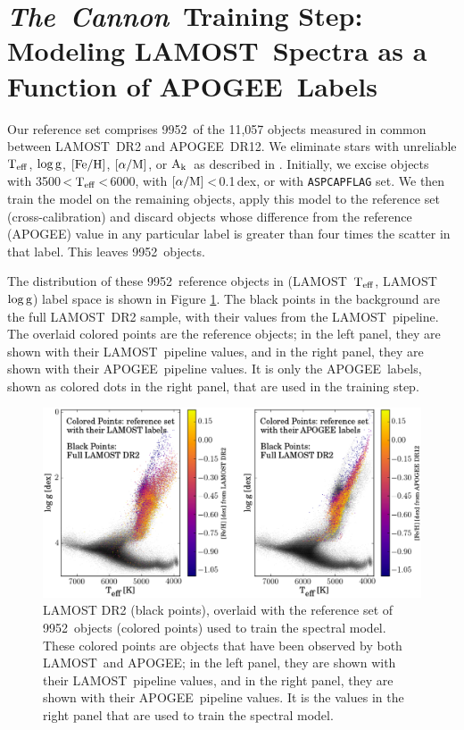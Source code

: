 \documentclass[12pt, letterpaper, preprint]{aastex}
\newcommand{\tc}{\textsl{The~Cannon}}
\newcommand{\apogee}{APOGEE}
\newcommand{\lamost}{LAMOST}
\newcommand{\teff}{\mbox{$\rm T_{eff}$}}
\newcommand{\feh}{\mbox{$\rm [Fe/H]$}}
\newcommand{\alpham}{\mbox{$\rm [\alpha/M]$}}
\newcommand{\logg}{\mbox{$\rm \log g$}}
\newcommand{\ak}{\mbox{$\rm A_k$}}
\newcommand{\ntrobj}{9952}
\begin{document}
\section{\tc\ Training Step: \\ Modeling \lamost\ Spectra as a Function of \apogee\ Labels}
\label{sec:training}

Our reference set comprises \ntrobj\ of the 11,057 objects measured in common between \lamost\ DR2 and \apogee\ DR12. 
We eliminate stars with
unreliable \teff, \logg, \feh, \alpham, or \ak\, as described in \citet{Holtzman2015}.
Initially, we excise objects with 3500\,\textless\,\teff\,\textless\,6000, 
with \alpham\,\textless\,0.1\,dex, 
or with \texttt{ASPCAPFLAG} set.
We then train the model on the remaining objects, apply this model
to the reference set (cross-calibration) and discard objects 
whose difference from the reference (\apogee) value
in any particular label is greater than four times the scatter in that label.
This leaves \ntrobj\ objects.

The distribution of these \ntrobj\ reference objects in (\lamost\ \teff, \lamost\ \logg) label space is shown in 
Figure \ref{fig:reference-set-label-space}. The black points in the background are the full
\lamost\ DR2 sample, with their values from the \lamost\ pipeline. 
The overlaid colored points are the reference objects; in the left panel, they are shown with their
\lamost\ pipeline values, and in the right panel, they are shown with their \apogee\ pipeline values.
It is only the \apogee\ labels, shown as colored dots in the right panel,
that are used in the training step. 

\begin{figure}[H]
\centering
\includegraphics[scale=0.6]{f3.eps}
\caption{
LAMOST DR2 (black points), overlaid with the reference set of \ntrobj\ objects (colored points) used to train the spectral model.
These colored points are objects that have been observed by both \lamost\ and \apogee;
in the left panel, they are shown with their
\lamost\ pipeline values, and in the right panel, they are shown with their \apogee\ pipeline values.
It is the values in the right panel that are used to train the spectral model.}
\label{fig:reference-set-label-space}
\end{figure}
\end{document}
